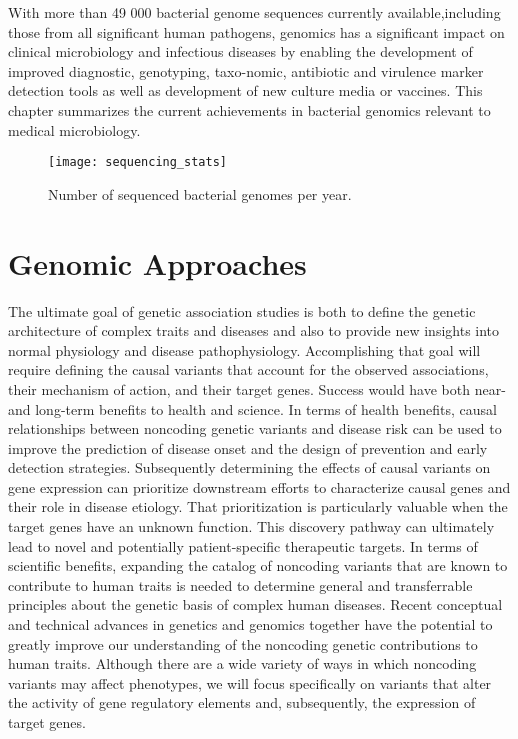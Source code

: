 With more than 49 000 bacterial genome sequences currently available,including those from all significant human pathogens, genomics has a significant impact on clinical microbiology and infectious diseases by enabling the development of improved diagnostic, genotyping, taxo-nomic, antibiotic and virulence marker detection tools as well as development of new culture media or vaccines. This chapter summarizes the current achievements in bacterial genomics relevant to medical microbiology.

\begin{figure}
	\centering
	\texttt{[image: sequencing\_stats]}
	\caption{ Number of sequenced bacterial genomes per year.}
	\label{fig:sequencing_stats}
\end{figure} 

\section{Genomic Approaches}
The ultimate goal of genetic association studies is both to define the genetic architecture of complex traits and diseases and also to provide new insights into normal physiology and disease pathophysiology. Accomplishing that goal will require defining the causal variants that account for the observed associations, their mechanism of action, and their target genes. Success would have both near- and long-term benefits to health and science. In terms of health benefits, causal relationships between noncoding genetic variants and disease risk can be used to improve the prediction of disease onset and the design of prevention and early detection strategies. Subsequently determining the effects of causal variants on gene expression can prioritize downstream efforts to characterize causal genes and their role in disease etiology. That prioritization is particularly valuable when the target genes have an unknown function. This discovery pathway can ultimately lead to novel and potentially patient-specific therapeutic targets. In terms of scientific benefits, expanding the catalog of noncoding variants that are known to contribute to human traits is needed to determine general and transferrable principles about the genetic basis of complex human diseases. Recent conceptual and technical advances in genetics and genomics together have the potential to greatly improve our understanding of the noncoding genetic contributions to human traits. Although there are a wide variety of ways in which noncoding variants may affect phenotypes, we will focus specifically on variants that alter the activity of gene regulatory elements and, subsequently, the expression of target genes\cite{lowe2015genomic}.

